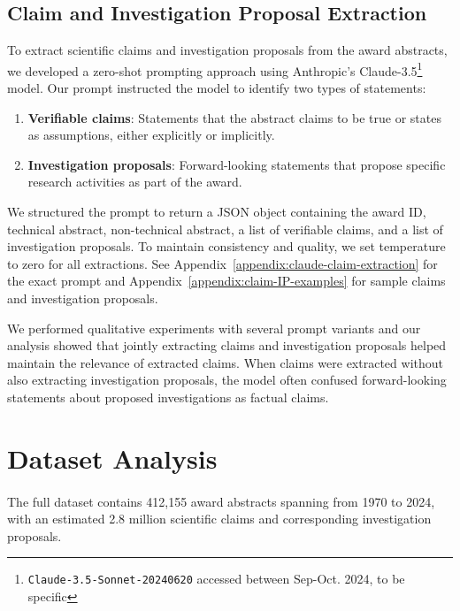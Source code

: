 \documentclass[11pt]{article}
\begin{document}
\subsection{Claim and Investigation Proposal Extraction}

To extract scientific claims and investigation proposals from the award abstracts, we developed a zero-shot prompting approach using Anthropic's Claude-3.5\footnote{\texttt{Claude-3.5-Sonnet-20240620} accessed between Sep-Oct. 2024, to be specific} model. Our prompt instructed the model to identify two types of statements:

\begin{enumerate}[noitemsep,topsep=0pt]
\item \textbf{Verifiable claims}: Statements that the abstract claims to be true or states as assumptions, either explicitly or implicitly.
\item \textbf{Investigation proposals}: Forward-looking statements that propose specific research activities as part of the award.
\end{enumerate}

We structured the prompt to return a JSON object containing the award ID, technical abstract, non-technical abstract, a list of verifiable claims, and a list of investigation proposals. To maintain consistency and quality, we set temperature to zero for all extractions. See Appendix~\ref{appendix:claude-claim-extraction} for the exact prompt and Appendix~\ref{appendix:claim-IP-examples} for sample claims and investigation proposals.

We performed qualitative experiments with several prompt variants and our analysis showed that jointly extracting claims and investigation proposals helped maintain the relevance of extracted claims. When claims were extracted without also extracting investigation proposals, the model often confused forward-looking statements about proposed investigations as factual claims.

\section{Dataset Analysis}
\paragraph{\DatasetName} The full dataset contains 412,155 award abstracts spanning from 1970 to 2024, with an estimated 2.8 million scientific claims and corresponding investigation proposals.
\end{document}
